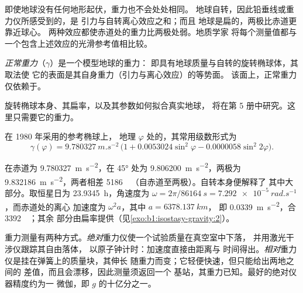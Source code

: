 即使地球没有任何地形起伏，重力也不会处处相同。
地球自转，因此铅垂线或重力仪所感受到的，是
引力与自转离心效应之和；而且
地球是扁的，两极比赤道更靠近球心。
两种效应都使赤道处的重力比两极处弱。地质学家
将每个测量值都与一个包含上述效应的光滑参考值相比较。

\begin{definition}[正常重力]\label{def:b1:isostasy-gravity:normal-gravity}
\emph{正常重力}（$\gamma$）是一个模型地球的重力：
即具有地球质量与自转的旋转椭球体，其取法使
它的表面是其自身重力（引力与离心效应）的等势面。
该面上，正常重力仅依赖于。
\end{definition}

旋转椭球本身、其扁率，以及其参数如何拟合真实地球，
将在第 5 册中研究。这里只需要它的重力。

\begin{proposition}[正常重力公式]\label{prop:b1:isostasy-gravity:normal-formula}
在 1980 年采用的参考椭球上，
地理 $\varphi$ 处的，其常用级数形式为
\[
  \gamma(\varphi) = \qty{9.780327}{m.s^{-2}}\,\bigl(1 + 0.0053024\sin^2\varphi
  - 0.0000058\sin^2 2\varphi\bigr).
\]
\end{proposition}
\admitted

在赤道为 \qty{9.780327}{m.s^{-2}}，在
\ang{45} 处为 \qty{9.806200}{m.s^{-2}}，两极为 \qty{9.832186}{m.s^{-2}}，两者相差
\qty{5186}{\milli\gal}（自赤道至两极）。自转本身便解释了
其中大部分。取恒星日为 \qty{23.9345}{h}，角速度为
$\omega = 2\pi/\qty{86164}{s} = \qty{7.292e-5}{rad.s^{-1}}$，而赤道处的离心
加速度为 $\omega^2 a$，其中 $a = \qty{6378.137}{km}$，
即 \qty{0.0339}{m.s^{-2}}，合 \qty{3392}{\milli\gal}；其余
部分由扁率提供（见\cref{exo:b1:isostasy-gravity:2}）。

重力测量有两种方式。\emph{绝对}重力仪使一个试验质量在真空室中下落，
并用激光干涉仪跟踪其自由落体，
以原子钟计时：加速度直接由距离与
时间得出。\emph{相对}重力仪是挂在弹簧上的质量块，其伸长
随重力而变；它轻便快速，但只能给出两地之间的
差值，而且会漂移，因此测量须返回一个
基站，其重力已知。最好的绝对仪器精度约为一
微伽，即 $g$ 的十亿分之一。

